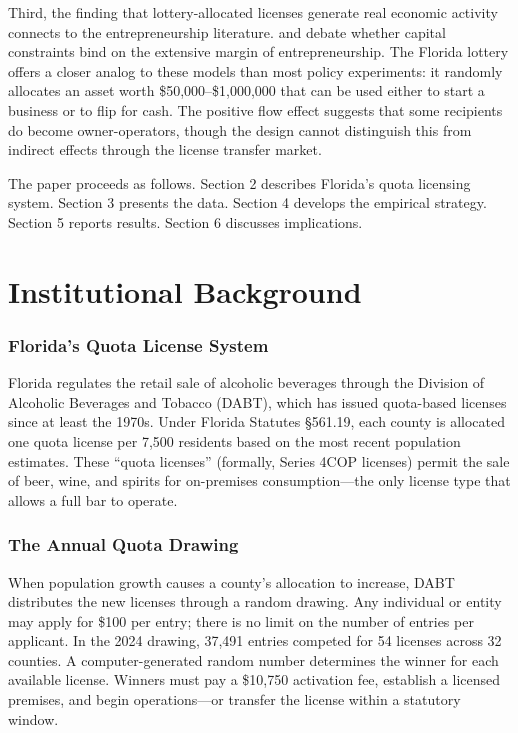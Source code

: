 \documentclass[12pt]{article}
\begin{document}
Third, the finding that lottery-allocated licenses generate real economic activity connects to the entrepreneurship literature. \citet{evans1989} and \citet{hurst2004} debate whether capital constraints bind on the extensive margin of entrepreneurship. The Florida lottery offers a closer analog to these models than most policy experiments: it randomly allocates an asset worth \$50,000--\$1,000,000 that can be used either to start a business or to flip for cash. The positive flow effect suggests that some recipients do become owner-operators, though the design cannot distinguish this from indirect effects through the license transfer market.

The paper proceeds as follows. Section 2 describes Florida's quota licensing system. Section 3 presents the data. Section 4 develops the empirical strategy. Section 5 reports results. Section 6 discusses implications.

\section{Institutional Background}

\subsubsection*{Florida's Quota License System} Florida regulates the retail sale of alcoholic beverages through the Division of Alcoholic Beverages and Tobacco (DABT), which has issued quota-based licenses since at least the 1970s. Under Florida Statutes \S561.19, each county is allocated one quota license per 7,500 residents based on the most recent population estimates. These ``quota licenses'' (formally, Series 4COP licenses) permit the sale of beer, wine, and spirits for on-premises consumption---the only license type that allows a full bar to operate.

\subsubsection*{The Annual Quota Drawing} When population growth causes a county's allocation to increase, DABT distributes the new licenses through a random drawing. Any individual or entity may apply for \$100 per entry; there is no limit on the number of entries per applicant. In the 2024 drawing, 37,491 entries competed for 54 licenses across 32 counties. A computer-generated random number determines the winner for each available license. Winners must pay a \$10,750 activation fee, establish a licensed premises, and begin operations---or transfer the license within a statutory window.
\end{document}
